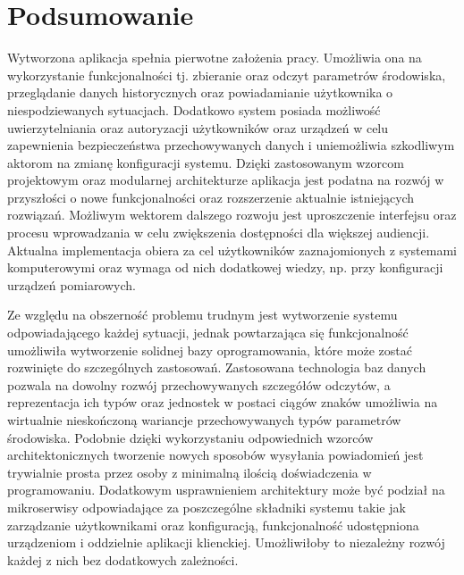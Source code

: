 \chapter{Podsumowanie}
Wytworzona aplikacja spełnia pierwotne założenia pracy. Umożliwia ona na 
wykorzystanie funkcjonalności tj. zbieranie oraz odczyt parametrów środowiska,
przeglądanie danych historycznych oraz powiadamianie użytkownika o niespodziewanych
sytuacjach. Dodatkowo system posiada możliwość uwierzytelniania oraz autoryzacji 
użytkowników oraz urządzeń w celu zapewnienia bezpieczeństwa przechowywanych danych
i uniemożliwia szkodliwym aktorom na zmianę konfiguracji systemu.
Dzięki zastosowanym wzorcom projektowym oraz modularnej architekturze aplikacja
jest podatna na rozwój w przyszłości o nowe funkcjonalności oraz rozszerzenie
aktualnie istniejących rozwiązań. Możliwym wektorem dalszego rozwoju jest
uproszczenie interfejsu oraz procesu wprowadzania w celu zwiększenia dostępności
dla większej audiencji. Aktualna implementacja obiera za cel użytkowników zaznajomionych
z systemami komputerowymi oraz wymaga od nich dodatkowej wiedzy, np. przy konfiguracji
urządzeń pomiarowych. 

Ze względu na obszerność problemu trudnym jest wytworzenie systemu odpowiadającego
każdej sytuacji, jednak powtarzająca się funkcjonalność umożliwiła wytworzenie
solidnej bazy oprogramowania, które może zostać rozwinięte do szczególnych zastosowań.
Zastosowana technologia baz danych pozwala na dowolny rozwój przechowywanych
szczegółów odczytów, a reprezentacja ich typów oraz jednostek w postaci ciągów
znaków umożliwia na wirtualnie nieskończoną wariancje przechowywanych
typów parametrów środowiska. Podobnie dzięki wykorzystaniu odpowiednich wzorców
architektonicznych tworzenie nowych sposobów wysyłania powiadomień jest trywialnie 
prosta przez osoby z minimalną ilością doświadczenia w programowaniu.
Dodatkowym usprawnieniem architektury może być podział na mikroserwisy odpowiadające
za poszczególne składniki systemu takie jak zarządzanie użytkownikami oraz konfiguracją, 
funkcjonalność udostępniona urządzeniom i oddzielnie aplikacji klienckiej. Umożliwiłoby
to niezależny rozwój każdej z nich bez dodatkowych zależności.
